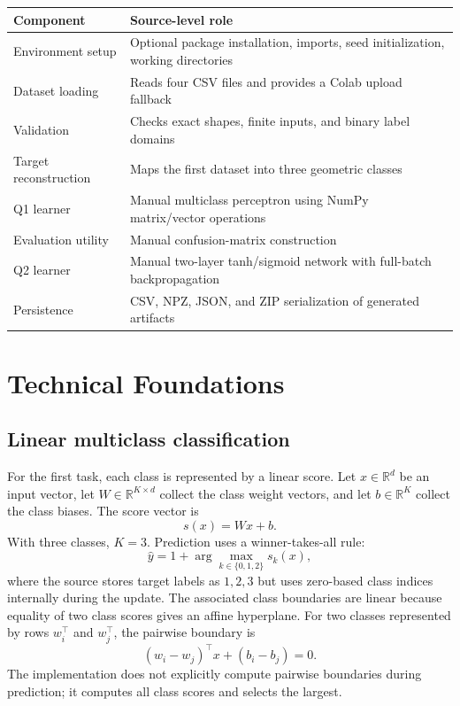 \documentclass[11pt,a4paper]{article}
\newcommand{\R}{\mathbb{R}}
\begin{document}
\begin{table}[ht]
\centering
\small
\begin{tabularx}{\textwidth}{>{\raggedright\arraybackslash}p{} X}
\toprule
\textbf{Component} & \textbf{Source-level role}\\
\midrule
Environment setup & Optional package installation, imports, seed initialization, working directories\\
Dataset loading & Reads four CSV files and provides a Colab upload fallback\\
Validation & Checks exact shapes, finite inputs, and binary label domains\\
Target reconstruction & Maps the first dataset into three geometric classes\\
Q1 learner & Manual multiclass perceptron using NumPy matrix/vector operations\\
Evaluation utility & Manual confusion-matrix construction\\
Q2 learner & Manual two-layer tanh/sigmoid network with full-batch backpropagation\\
Persistence & CSV, NPZ, JSON, and ZIP serialization of generated artifacts\\
\bottomrule
\end{tabularx}
\end{table}

\section{Technical Foundations}
\subsection{Linear multiclass classification}
For the first task, each class is represented by a linear score. Let \(x \in \R^d\) be an input vector, let \(W \in \R^{K\times d}\) collect the class weight vectors, and let \(b \in \R^K\) collect the class biases. The score vector is
\begin{equation}
    s(x) = Wx + b.
\end{equation}
With three classes, \(K=3\). Prediction uses a winner-takes-all rule:
\begin{equation}
    \hat{y} = 1 + \arg\max_{k\in\{0,1,2\}} s_k(x),
\end{equation}
where the source stores target labels as \(1,2,3\) but uses zero-based class indices internally during the update. The associated class boundaries are linear because equality of two class scores gives an affine hyperplane. For two classes represented by rows \(w_i^\top\) and \(w_j^\top\), the pairwise boundary is
\begin{equation}
    (w_i-w_j)^\top x + (b_i-b_j)=0.
\end{equation}
The implementation does not explicitly compute pairwise boundaries during prediction; it computes all class scores and selects the largest.
\end{document}
